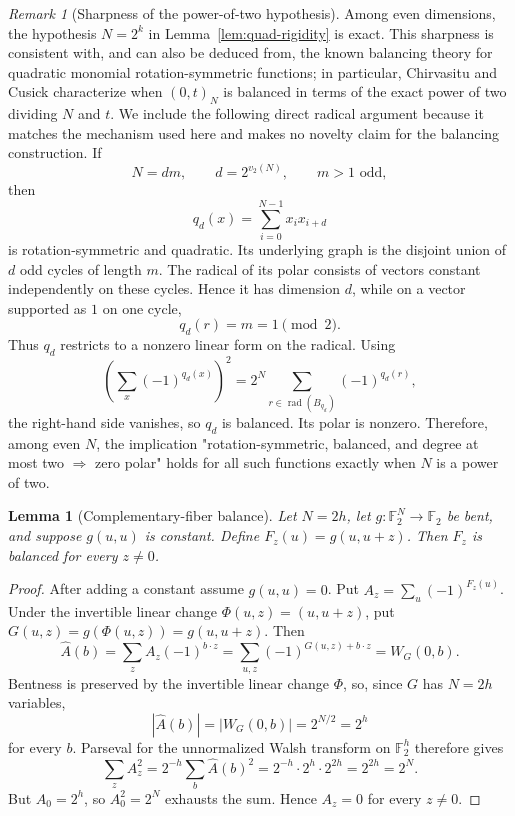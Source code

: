 \documentclass[11pt,a4paper]{article}
\newtheorem{lemma}[theorem]{Lemma}
\theoremstyle{remark}
\newtheorem{remark}[theorem]{Remark}
\theoremstyle{plain}
\newcommand{\F}{\mathbb F_2}
\begin{document}
\begin{remark}[Sharpness of the power-of-two hypothesis]\label{rem:quad-sharp}
Among even dimensions, the hypothesis \(N=2^k\) in Lemma~\ref{lem:quad-rigidity} is exact. This sharpness is consistent with, and can also be deduced from, the known balancing theory for quadratic monomial rotation-symmetric functions; in particular, Chirvasitu and Cusick characterize when \((0,t)_N\) is balanced in terms of the exact power of two dividing \(N\) and \(t\). We include the following direct radical argument because it matches the mechanism used here and makes no novelty claim for the balancing construction. If
\[
N=dm,\qquad d=2^{v_2(N)},\qquad m>1\text{ odd},
\]
then
\[
q_d(x)=\sum_{i=0}^{N-1}x_i x_{i+d}
\]
is rotation-symmetric and quadratic. Its underlying graph is the disjoint union of \(d\) odd cycles of length \(m\). The radical of its polar consists of vectors constant independently on these cycles. Hence it has dimension \(d\), while on a vector supported as \(1\) on one cycle,
\[
q_d(r)=m=1\pmod2.
\]
Thus \(q_d\) restricts to a nonzero linear form on the radical. Using
\[
\left(\sum_x(-1)^{q_d(x)}\right)^2
=2^N\sum_{r\in\operatorname{rad}(B_{q_d})}(-1)^{q_d(r)},
\]
the right-hand side vanishes, so \(q_d\) is balanced. Its polar is nonzero. Therefore, among even \(N\), the implication "rotation-symmetric, balanced, and degree at most two $\Longrightarrow$ zero polar" holds for all such functions exactly when \(N\) is a power of two.
\end{remark}

\begin{lemma}[Complementary-fiber balance]\label{lem:fiber-balance}
Let \(N=2h\), let \(g:\F^N\to\F\) be bent, and suppose \(g(u,u)\) is constant. Define \(F_z(u)=g(u,u+z)\). Then \(F_z\) is balanced for every \(z\ne0\).
\end{lemma}
\begin{proof}
After adding a constant assume \(g(u,u)=0\). Put \(A_z=\sum_u(-1)^{F_z(u)}\). Under the invertible linear change \(\Phi(u,z)=(u,u+z)\), put \(G(u,z)=g(\Phi(u,z))=g(u,u+z)\). Then
\[
\widehat A(b)=\sum_z A_z(-1)^{b\cdot z}
=\sum_{u,z}(-1)^{G(u,z)+b\cdot z}
=W_G(0,b).
\]
Bentness is preserved by the invertible linear change \(\Phi\), so, since \(G\) has \(N=2h\) variables,
\[
|\widehat A(b)|=|W_G(0,b)|=2^{N/2}=2^h
\]
for every \(b\). Parseval for the unnormalized Walsh transform on \(\F^h\) therefore gives
\[
\sum_zA_z^2
=2^{-h}\sum_b\widehat A(b)^2
=2^{-h}\cdot 2^h\cdot 2^{2h}
=2^{2h}=2^N.
\]
But \(A_0=2^h\), so \(A_0^2=2^N\) exhausts the sum. Hence \(A_z=0\) for every \(z\ne0\).
\end{proof}
\end{document}
